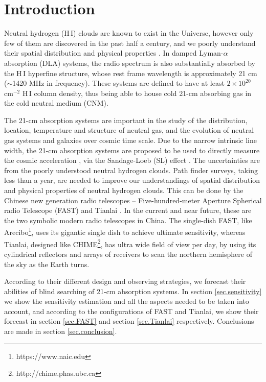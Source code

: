 \documentclass[]{raa}
\newcommand{\HI}{{H{\small\,I}}}
\begin{document}
\section{Introduction}\label{sec.introduction}
Neutral hydrogen (\HI) clouds are known to exist in the Universe,
however only few of them are discovered in the past half a century,
and we poorly understand their spatial distribution and physical
properties \citep{2005ARA&A..43..861W}. 
In damped Lyman-$\alpha$ absorption (DLA)
systems, the radio spectrum is also substantially absorbed by the {\HI}
hyperfine structure, whose rest frame wavelength is approximately 21 cm
($\sim$1420 MHz in frequency). These systems are defined to have
at least $2\times 10^{20}$ cm$^{-2}$ {\HI} column density, thus being
able to house cold 21-cm absorbing gas in the cold neutral medium (CNM).

The 21-cm absorption systems are important in the study of the 
distribution, location, temperature and structure of neutral gas,
and the evolution of neutral gas systems and galaxies over
cosmic time scale.
Due to the narrow intrinsic line width, the 21-cm absorption systems
are proposed to be used to directly measure the cosmic acceleration
\citep{2012ApJ...761L..26D,2014PhRvL.113d1303Y}, via the 
Sandage-Loeb (SL) effect \citep{1962ApJ...136..319S,1998ApJ...499L.111L}.
The uncertainties are from the poorly understood neutral hydrogen
clouds. Path finder surveys, taking less than a year, are needed
to improve our understandings of spatial distribution and physical
properties of neutral hydrogen clouds.
This can be done by the Chinese new generation radio telescopes --
Five-hundred-meter Aperture Spherical radio Telescope (FAST)
\citep{2016RaSc...51.1060L} and
Tianlai \citep{2012IJMPS..12..256C}. In the current and near future,
these are the two symbolic modern radio telescopes in China.
The single-dish FAST, like Arecibo\footnote{https://www.naic.edu},
uses its gigantic single dish to achieve ultimate sensitivity, whereas
Tianlai, designed like CHIME\footnote{http://chime.phas.ubc.ca},
has ultra wide field of view per day, by
using its cylindrical reflectors and arrays of receivers to
scan the northern hemisphere of the sky as the Earth turns.

According to their different design and observing strategies,
we forecast their abilities of blind searching of 21-cm absorption
systems. In section \ref{sec.sensitivity} we show the sensitivity
estimation and all the aspects
needed to be taken into account,
and according to the configurations of FAST and Tianlai,
we show their forecast in section \ref{sec.FAST}
and section \ref{sec.Tianlai} respectively.
Conclusions are made in section \ref{sec.conclusion}.
\end{document}
